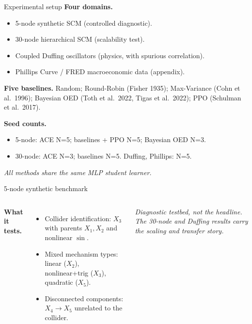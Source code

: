\documentclass[aspectratio=169,10pt]{beamer}
\begin{document}
\begin{frame}{Experimental setup}
\textbf{Four domains.}
\begin{itemize}\itemsep=0.05em
\item 5-node synthetic SCM (controlled diagnostic).
\item 30-node hierarchical SCM (scalability test).
\item Coupled Duffing oscillators (physics, with spurious correlation).
\item Phillips Curve / FRED macroeconomic data (appendix).
\end{itemize}
\smallskip

\textbf{Five baselines.} Random; Round-Robin (Fisher 1935); Max-Variance
(Cohn et al.\ 1996); Bayesian OED (Toth et al.\ 2022, Tigas et al.\ 2022); PPO (Schulman et al.\ 2017).
\smallskip

\textbf{Seed counts.}
\begin{itemize}\itemsep=0em
\item 5-node: ACE N=5; baselines + PPO N=5; Bayesian OED N=3.
\item 30-node: ACE N=3; baselines N=5. \quad Duffing, Phillips: N=5.
\end{itemize}
\textit{All methods share the same MLP student learner.}
\end{frame}

\begin{frame}{5-node synthetic benchmark}
\begin{columns}[T,onlytextwidth]
\centering
{}
\small
\textbf{What it tests.}
\begin{itemize}
\item Collider identification: $X_3$ with parents $X_1,X_2$ and nonlinear $\sin$.
\item Mixed mechanism types: linear ($X_2$), nonlinear+trig ($X_3$), quadratic ($X_5$).
\item Disconnected components: $X_4\to X_5$ unrelated to the collider.
\end{itemize}
\smallskip
\textit{Diagnostic testbed, not the headline. The 30-node and Duffing
results carry the scaling and transfer story.}
\end{columns}
\end{frame}
\end{document}
